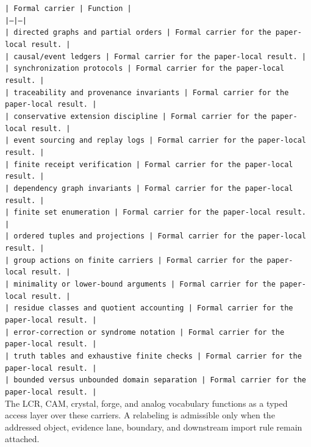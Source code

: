 \documentclass[11pt]{article}
\begin{document}
\noindent\texttt{| Formal carrier | Function |}\\
\noindent\texttt{|---|---|}\\
\noindent\texttt{| directed graphs and partial orders | Formal carrier for the paper-local result. |}\\
\noindent\texttt{| causal/event ledgers | Formal carrier for the paper-local result. |}\\
\noindent\texttt{| synchronization protocols | Formal carrier for the paper-local result. |}\\
\noindent\texttt{| traceability and provenance invariants | Formal carrier for the paper-local result. |}\\
\noindent\texttt{| conservative extension discipline | Formal carrier for the paper-local result. |}\\
\noindent\texttt{| event sourcing and replay logs | Formal carrier for the paper-local result. |}\\
\noindent\texttt{| finite receipt verification | Formal carrier for the paper-local result. |}\\
\noindent\texttt{| dependency graph invariants | Formal carrier for the paper-local result. |}\\
\noindent\texttt{| finite set enumeration | Formal carrier for the paper-local result. |}\\
\noindent\texttt{| ordered tuples and projections | Formal carrier for the paper-local result. |}\\
\noindent\texttt{| group actions on finite carriers | Formal carrier for the paper-local result. |}\\
\noindent\texttt{| minimality or lower-bound arguments | Formal carrier for the paper-local result. |}\\
\noindent\texttt{| residue classes and quotient accounting | Formal carrier for the paper-local result. |}\\
\noindent\texttt{| error-correction or syndrome notation | Formal carrier for the paper-local result. |}\\
\noindent\texttt{| truth tables and exhaustive finite checks | Formal carrier for the paper-local result. |}\\
\noindent\texttt{| bounded versus unbounded domain separation | Formal carrier for the paper-local result. |}\\

The LCR, CAM, crystal, forge, and analog vocabulary functions as a typed access
layer over these carriers. A relabeling is admissible only when the addressed
object, evidence lane, boundary, and downstream import rule remain attached.
\end{document}
